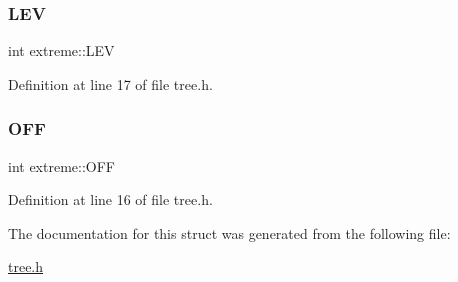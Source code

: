 \subsubsection{\texorpdfstring{L\+EV}{LEV}}
{\footnotesize\ttfamily int extreme\+::\+L\+EV}



Definition at line 17 of file tree.\+h.

\mbox{\label{structextreme_a2594b8d2d70bf2297ff656589114fb44}} 
\subsubsection{\texorpdfstring{O\+FF}{OFF}}
{\footnotesize\ttfamily int extreme\+::\+O\+FF}



Definition at line 16 of file tree.\+h.



The documentation for this struct was generated from the following file\+:\begin{DoxyCompactItemize}
\item 
\mbox{\hyperlink{tree_8h}{tree.\+h}}\end{DoxyCompactItemize}
